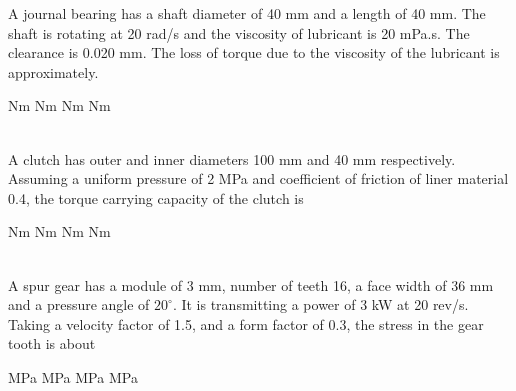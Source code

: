 \documentclass[addpoints,11pt]{exam}
\begin{document}
\begin{questions}
        \question A journal bearing has a shaft diameter of 40 mm and a length of 40 mm. The shaft is rotating at 20 rad/s and the viscosity of lubricant is 20 mPa.s. The clearance is 0.020 mm. The loss of torque due to the viscosity of the lubricant is approximately.\\

        \begin{oneparchoices}
             Nm
             Nm
             Nm
             Nm
        \end{oneparchoices}\\

        \question A clutch has outer and inner diameters 100 mm and 40 mm respectively. Assuming a uniform pressure of 2 MPa and coefficient of friction of liner material 0.4, the torque carrying capacity of the clutch is\\

        \begin{oneparchoices}
             Nm
             Nm
             Nm
             Nm
        \end{oneparchoices}\\

        \question A spur gear has a module of 3 mm, number of teeth 16, a face width of 36 mm and a pressure angle of $20^\circ$. It is transmitting a power of 3 kW at 20 rev/s. Taking a velocity factor of 1.5, and a form factor of 0.3, the stress in the gear tooth is about\\

        \begin{oneparchoices}
             MPa
             MPa
             MPa
             MPa
        \end{oneparchoices}\\


\end{questions}
\end{document}
